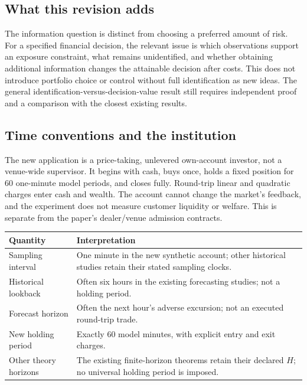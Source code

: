 \subsection*{What this revision adds}
The information question is distinct from choosing a preferred amount of risk.
For a specified financial decision, the relevant issue is which observations
support an exposure constraint, what remains unidentified, and whether obtaining
additional information changes the attainable decision after costs. This does
not introduce portfolio choice or control without full identification as new
ideas. The general identification-versus-decision-value result still requires
independent proof and a comparison with the closest existing results.

\subsection*{Time conventions and the institution}
The new application is a price-taking, unlevered own-account investor, not a
venue-wide supervisor. It begins with cash, buys once, holds a fixed position
for 60 one-minute model periods, and closes fully. Round-trip linear and
quadratic charges enter cash and wealth. The account cannot change the market's
feedback, and the experiment does not measure customer liquidity or welfare.
This is separate from the paper's dealer/venue admission contracts.

\begin{center}\small
\begin{tabular}{p{}p{}}
\toprule
Quantity & Interpretation\\
\midrule
Sampling interval & One minute in the new synthetic account; other historical studies retain their stated sampling clocks.\\
Historical lookback & Often six hours in the existing forecasting studies; not a holding period.\\
Forecast horizon & Often the next hour's adverse excursion; not an executed round-trip trade.\\
New holding period & Exactly 60 model minutes, with explicit entry and exit charges.\\
Other theory horizons & The existing finite-horizon theorems retain their declared $H$; no universal holding period is imposed.\\
\bottomrule
\end{tabular}
\end{center}

